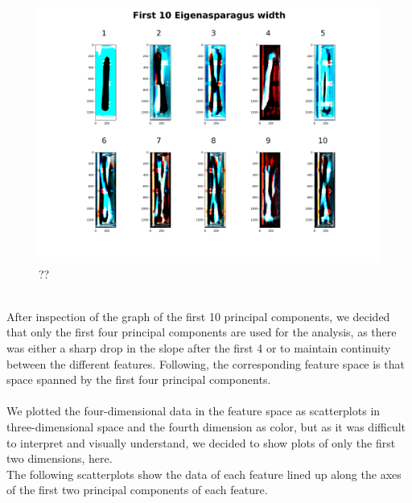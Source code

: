 \begin{figure}[h]
	\centering
	\includegraphics[scale=0.05]{Figures/chapter04/pc_width}
	\decoRule
	\caption[??]{??}
	\label{fig:PrincipalComponentWidth}
\end{figure}
\\
After inspection of the graph of the first 10 principal components, we decided that only the  first four principal components are used for the analysis, as there was either a sharp drop in the slope after the first 4 or to maintain continuity between the different features. Following, the corresponding feature space is that space spanned by the first four principal components. \\
 \\
We plotted the four-dimensional data in the feature space as scatterplots in three-dimensional space and the fourth dimension as color, but as it was difficult to interpret and visually understand, we decided to show plots of only the first two dimensions, here. 
\\ 
The following scatterplots show the data of each feature lined up along the axes of the first two principal components of each feature. \\

